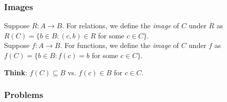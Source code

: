         \subsubsection{Images}

            \begin{definition}
                Suppose $R\colon A \rightarrow B$. For relations, we define the \textit{image} of $C$ under $R$ as $R(C) = \{b\in B\colon (c,b) \in R$ for some $c\in C\}$. \\
                
                Suppose $f\colon A \rightarrow B$. For functions, we define the \textit{image} of $C$ under $f$ as $f(C) = \{b\in B\colon f(c) = b$ for some $c\in C\}$. \\
            \end{definition}

            \textbf{Think}: $f(C) \subseteq B$ vs. $f(c) \in B$ for $c\in C$. \\

        \subsubsection{Problems}



